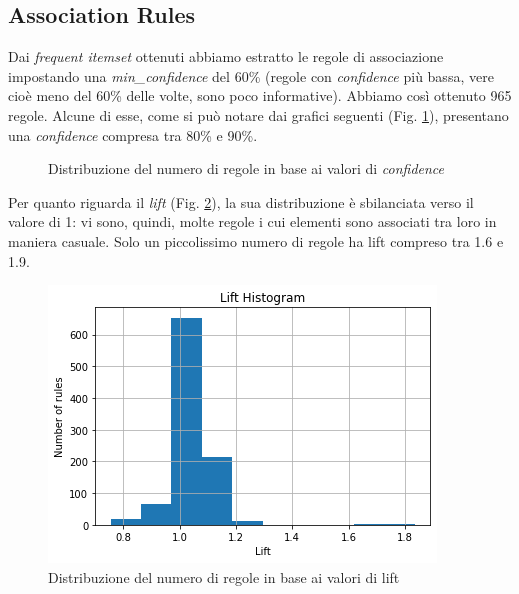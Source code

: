\subsection{Association Rules}
Dai \textit{frequent itemset} ottenuti abbiamo estratto le regole di associazione impostando una \textit{min\_confidence} del 60\% (regole con \textit{confidence} più bassa, vere cioè meno del 60\% delle volte, sono poco informative). Abbiamo così ottenuto 965 regole. Alcune di esse, come si può notare dai grafici seguenti (Fig. \ref{Confidence}), presentano una \textit{confidence} compresa tra 80\% e 90\%. 
\begin{figure}[H]
	\centering
	\quad
	\caption{Distribuzione del numero di regole in base ai valori di \textit{confidence}}
	\label{Confidence}
\end{figure}
\noindent 
Per quanto riguarda il \textit{lift} (Fig. \ref{lift}), la sua distribuzione è sbilanciata verso il valore di 1: vi sono, quindi, molte regole i cui elementi sono associati tra loro in maniera casuale. Solo un piccolissimo numero di regole ha lift compreso tra 1.6 e 1.9. 
\begin{figure}[H]
    \centering
    \includegraphics[scale=0.5]{Immagini/lift.png}
    \caption{Distribuzione del numero di regole in base ai valori di lift}
    \label{lift}
\end{figure}
